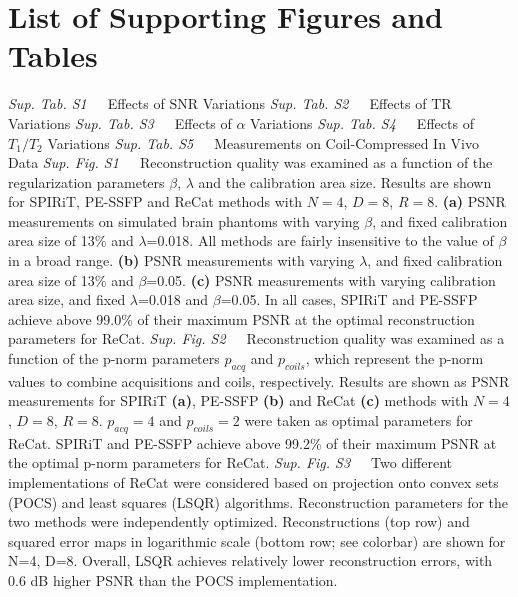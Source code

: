 \documentclass[11pt, onecolumn]{article}
\begin{document}
\section*{List of Supporting Figures and Tables}
{\textit{Sup. Tab. S1}~~~Effects of $\textrm{SNR}$ Variations\dotfill}
{\newline\textit{Sup. Tab. S2}~~~Effects of $\textrm{TR}$ Variations\dotfill}
{\newline\textit{Sup. Tab. S3}~~~Effects of $\alpha$ Variations\dotfill}
{\newline\textit{Sup. Tab. S4}~~~Effects of $T_1/T_2$ Variations\dotfill}
{\newline\textit{Sup. Tab. S5}~~~Measurements on Coil-Compressed In Vivo Data\dotfill}
{\newline\textit{Sup. Fig. S1}~~~Reconstruction quality was examined as a function of the regularization parameters $\beta$, $\lambda$ and the calibration area size. Results are shown for SPIRiT, PE-SSFP and ReCat methods with $N=4$, $D=8$, $R=8$. \textbf{(a)} PSNR measurements on simulated brain phantoms with varying $\beta$, and fixed calibration area size of 13\% and $\lambda$=0.018. All methods are fairly insensitive to the value of $\beta$ in a broad range. \textbf{(b)} PSNR measurements with varying $\lambda$, and fixed calibration area size of 13\% and $\beta$=0.05. \textbf{(c)} PSNR measurements with varying calibration area size, and fixed $\lambda$=0.018 and $\beta$=0.05. In all cases, SPIRiT and PE-SSFP achieve above 99.0\% of their maximum PSNR at the optimal reconstruction parameters for ReCat.\dotfill}
{\newline\textit{Sup. Fig. S2}~~~Reconstruction quality was examined as a function of the p-norm  parameters $p_{acq}$ and $p_{coils}$, which represent the p-norm values to combine acquisitions and coils, respectively. Results are shown as PSNR measurements for SPIRiT \textbf{(a)}, PE-SSFP \textbf{(b)} and ReCat \textbf{(c)} methods with $N=4$, $D=8$, $R=8$. $p_{acq}=4$ and $p_{coils}=2$ were taken as optimal parameters for ReCat. SPIRiT and PE-SSFP achieve above 99.2\% of their maximum PSNR at the optimal p-norm parameters for ReCat.\dotfill}
{\newline\textit{Sup. Fig. S3}~~~Two different implementations of ReCat were considered based on projection onto convex sets (POCS) and least squares (LSQR) algorithms. Reconstruction parameters for the two methods were independently optimized. Reconstructions (top row) and squared error maps in logarithmic scale (bottom row; see colorbar) are shown for N=4, D=8. Overall, LSQR achieves relatively lower reconstruction errors, with 0.6 dB higher PSNR than the POCS implementation.\dotfill}
\end{document}

